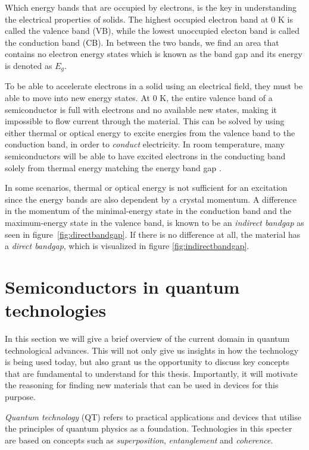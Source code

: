 Which energy bands that are occupied by electrons, is the key in understanding the electrical properties of solids. The highest occupied electron band at $0$ K is called the valence band (VB), while the lowest unoccupied electon band is called the conduction band (CB). In between the two bands, we find an area that contains no electron energy states which is known as the band gap and its energy is denoted as $E_g$.

To be able to accelerate electrons in a solid using an electrical field, they must be able to move into new energy states. At $0$ K, the entire valence band of a semiconductor is full with electrons and no available new states, making it impossible to flow current through the material. This can be solved by using either thermal or optical energy to excite energies from the valence band to the conduction band, in order to \textit{conduct} electricity. In room temperature, many semiconductors will be able to have excited electrons in the conducting band solely from thermal energy matching the energy band gap \cite{BenStreetman2015}.

In some scenarios, thermal or optical energy is not sufficient for an excitation since the energy bands are also dependent by a crystal momentum. A difference in the momentum of the minimal-energy state in the conduction band and the maximum-energy state in the valence band, is known to be an \textit{indirect bandgap} as seen in figure \ref{fig:directbandgap}. If there is no difference at all, the material has a \textit{direct bandgap}, which is visualized in figure \ref{fig:indirectbandgap}.

\section{Semiconductors in quantum technologies}

In this section we will give a brief overview of the current domain in quantum technological advances. This will not only give us insights in how the technology is being used today, but also grant us the opportunity to discuss key concepts that are fundamental to understand for this thesis. Importantly, it will motivate the reasoning for finding new materials that can be used in devices for this purpose.

\textit{Quantum technology} (QT) refers to practical applications and devices that utilise the principles of quantum physics as a foundation. Technologies in this specter are based on concepts such as \textit{superposition}, \textit{entanglement} and \textit{coherence}.

